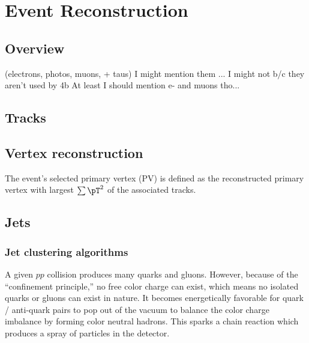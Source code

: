 \chapter{Event Reconstruction}
\label{ch:evtReco}

\section{Overview}
(electrons, photos, muons, + taus)
I might mention them ... I might not b/c they aren't used by 4b
At least I should mention e- and muons tho...

\section{Tracks}

\section{Vertex reconstruction}

The event's selected primary vertex (PV) is defined as the reconstructed primary vertex with largest $\sum \pT^2$ of the associated tracks. 


\section{Jets}

\subsection{Jet clustering algorithms}

A given $pp$ collision produces many quarks and gluons.  However, because of the ``confinement principle,'' no free color charge can exist, which means no isolated quarks or gluons can exist in nature. %
It becomes energetically favorable for quark / anti-quark pairs to pop out of the vacuum to balance the color charge imbalance by forming color neutral hadrons. 
This sparks a chain reaction which produces a spray of particles in the detector. 

